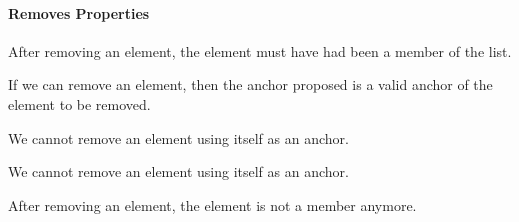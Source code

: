 \paragraph*{Removes Properties}

\begin{theorem}
  \label{thm:MUList.Properties.EnabledRemove }
  \leanok
  \end{theorem} 
\begin{theorem}
  \label{thm:MUList.Properties.EnabledRemove'}
  \leanok
  \end{theorem} 

\begin{theorem}
  \label{thm:MUList.Properties.Removes_members}
  \leanok
  After removing an element, the element must have had been a member of the
list.
  \end{theorem} 
  
\begin{theorem}
  \label{thm:MUList.Properties.Removes_anch}
  \leanok
  If we can remove an element, then the anchor proposed is a valid anchor of the
element to be removed.
  \end{theorem} 

\begin{theorem}
  \label{thm:MUList.Properties.NotRemoveself'}
  \leanok
  We cannot remove an element using itself as an anchor.
  \end{theorem} 

\begin{theorem}
  \label{thm:MUList.Properties.NotRemoveSelf}
  \leanok
  We cannot remove an element using itself as an anchor.
  \end{theorem} 
  
\begin{theorem}
  \label{thm:MUList.Properties.Removes_finds_none}
  \leanok
  After removing an element, the element is not a member anymore.
  \end{theorem} 

